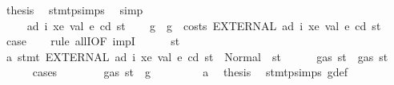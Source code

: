 \begin{isabellebody}
\ {\isacharquery}{\kern0pt}thesis\ \isamarkupfalse%
\ stmt{\isachardot}{\kern0pt}psimps{\isacharparenleft}{\kern0pt}{}{\isacharparenright}{\kern0pt}\ \isamarkupfalse%
\ simp\isanewline
\ \ \ \ \ \ \ \ \ \ \ \ \isamarkupfalse%
\isanewline
\ \ \ \ \ \ \ \ \ \ \isamarkupfalse%
\isanewline
\ \ \ \ \ \ \ \ \isamarkupfalse%
\isanewline
\ \ \ \ \ \ \isamarkupfalse%
\isanewline
\ \ \ \ \isamarkupfalse%
\isanewline
\ \ \isamarkupfalse%
\isanewline
{}\isamarkupfalse%
\isanewline
\ \ \isamarkupfalse%
\ {\isacharparenleft}{\kern0pt}{}\ ad\ i\ xe\ val\ e\ cd\ st{\isacharparenright}{\kern0pt}\isanewline
\ \ \isamarkupfalse%
\ g\ \ {\isachardoublequoteopen}g\ {\isacharequal}{\kern0pt}\ costs\ {\isacharparenleft}{\kern0pt}EXTERNAL\ ad\ i\ xe\ val{\isacharparenright}{\kern0pt}\ e\ cd\ st{\isachardoublequoteclose}\isanewline
\ \ \isamarkupfalse%
\ {\isacharquery}{\kern0pt}case\isanewline
\ \ \isamarkupfalse%
\ {\isacharparenleft}{\kern0pt}rule\ allI{\isacharbrackleft}{\kern0pt}OF\ impI{\isacharbrackright}{\kern0pt}{\isacharparenright}{\kern0pt}\isanewline
\ \ \ \ \isamarkupfalse%
\ st{}{\isacharprime}{\kern0pt}\ \isamarkupfalse%
\ a{}{\isacharcolon}{\kern0pt}\ {\isachardoublequoteopen}stmt\ {\isacharparenleft}{\kern0pt}EXTERNAL\ ad\ i\ xe\ val{\isacharparenright}{\kern0pt}\ e\ cd\ st\ {\isacharequal}{\kern0pt}\ Normal\ {\isacharparenleft}{\kern0pt}{\isacharparenleft}{\kern0pt}{\isacharparenright}{\kern0pt}{\isacharcomma}{\kern0pt}\ st{}{\isacharprime}{\kern0pt}{\isacharparenright}{\kern0pt}{\isachardoublequoteclose}\isanewline
\ \ \ \ \isamarkupfalse%
\ {\isachardoublequoteopen}gas\ st{}{\isacharprime}{\kern0pt}\ {\isasymle}\ gas\ st{\isachardoublequoteclose}\isanewline
\ \ \ \ \isamarkupfalse%
\ {\isacharparenleft}{\kern0pt}cases{\isacharparenright}{\kern0pt}\isanewline
\ \ \ \ \ \ \isamarkupfalse%
\ {\isachardoublequoteopen}gas\ st\ {\isasymle}\ g{\isachardoublequoteclose}\isanewline
\ \ \ \ \ \ \isamarkupfalse%
\ {}{\isacharparenleft}{\kern0pt}{}{\isacharparenright}{\kern0pt}\ a{}\ \isamarkupfalse%
\ {\isacharquery}{\kern0pt}thesis\ \isamarkupfalse%
\ stmt{\isachardot}{\kern0pt}psimps{\isacharparenleft}{\kern0pt}{}{\isacharparenright}{\kern0pt}\ g{\isacharunderscore}{\kern0pt}def\ \isamarkupfalse%

\end{isabellebody}
